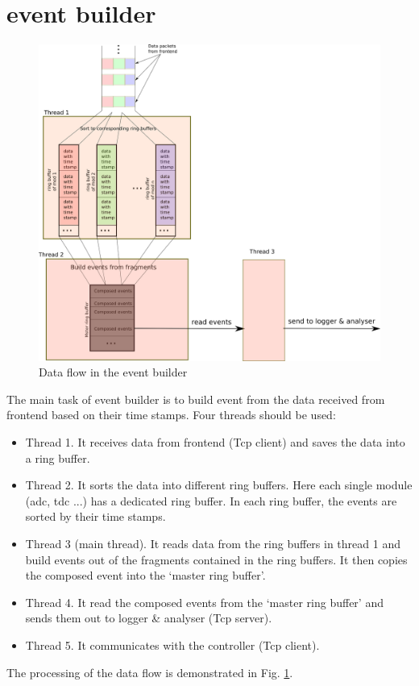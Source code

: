 \documentclass[a4paper,12pt]{article}
\begin{document}
	\section{event builder}
	\begin{figure}
		\begin{center}
			\includegraphics[width=.9\textwidth]{figs/data_format.eps}
			\caption{\label{fig03}Data flow in the event builder }
		\end{center}
	\end{figure}
	The main task of event builder is to build event from the data received
	from frontend based on their time stamps. Four threads should be used:
	\begin{itemize}
		\item Thread 1. It receives data from frontend (Tcp client) and
			saves the data into a ring buffer.
		\item Thread 2. It sorts the data into different ring buffers. Here
			each single module (adc, tdc ...) has a dedicated ring buffer.
			In each ring buffer, the events are sorted by their time stamps.
		\item Thread 3 (main thread). It reads data from the ring buffers in
			thread 1 and build events out of the fragments contained in the
			ring buffers. It then copies the composed event into the `master
			ring buffer'.
		\item Thread 4. It read the composed events from the `master ring
			buffer' and sends them out to logger \& analyser (Tcp server).
		\item Thread 5. It communicates with the controller (Tcp client).
	\end{itemize}
	The processing of the data flow is demonstrated in Fig. \ref{fig03}.
\end{document}
